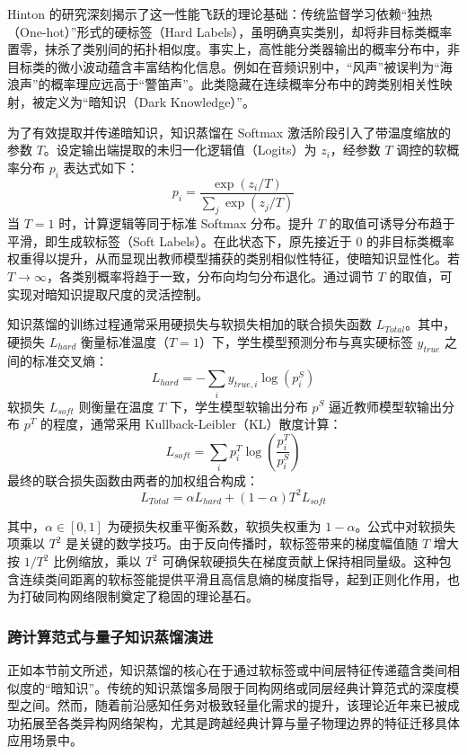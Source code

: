 Hinton 的研究深刻揭示了这一性能飞跃的理论基础：传统监督学习依赖“独热（One-hot）”形式的硬标签（Hard Labels），虽明确真实类别，却将非目标类概率置零，抹杀了类别间的拓扑相似度。事实上，高性能分类器输出的概率分布中，非目标类的微小波动蕴含丰富结构化信息。例如在音频识别中，“风声”被误判为“海浪声”的概率理应远高于“警笛声”。此类隐藏在连续概率分布中的跨类别相关性映射，被定义为“暗知识（Dark Knowledge）”。

为了有效提取并传递暗知识，知识蒸馏在 Softmax 激活阶段引入了带温度缩放的参数 $T$。设定输出端提取的未归一化逻辑值（Logits）为 $z_i$，经参数 $T$ 调控的软概率分布 $p_i$ 表达式如下：
\begin{equation}
	p_i = \frac{\exp(z_i / T)}{\sum_j \exp(z_j / T)}
\end{equation}
当 $T=1$ 时，计算逻辑等同于标准 Softmax 分布。提升 $T$ 的取值可诱导分布趋于平滑，即生成软标签（Soft Labels）。在此状态下，原先接近于 0 的非目标类概率权重得以提升，从而显现出教师模型捕获的类别相似性特征，使暗知识显性化。若 $T \to \infty$，各类别概率将趋于一致，分布向均匀分布退化。通过调节 $T$ 的取值，可实现对暗知识提取尺度的灵活控制。

知识蒸馏的训练过程通常采用硬损失与软损失相加的联合损失函数 $L_{Total}$。其中，硬损失 $L_{hard}$ 衡量标准温度（$T=1$）下，学生模型预测分布与真实硬标签 $y_{true}$ 之间的标准交叉熵：
\begin{equation}
	L_{hard} = - \sum_i y_{true, i} \log (p^S_i)
\end{equation}
软损失 $L_{soft}$ 则衡量在温度 $T$ 下，学生模型软输出分布 $p^S$ 逼近教师模型软输出分布 $p^T$ 的程度，通常采用 Kullback-Leibler（KL）散度计算：
\begin{equation}
	L_{soft} = \sum_i p^T_i \log\left(\frac{p^T_i}{p^S_i}\right)
\end{equation}
最终的联合损失函数由两者的加权组合构成：
\begin{equation}
	L_{Total} = \alpha L_{hard} + (1 - \alpha) T^2 L_{soft}
	\label{eq:kd_loss}
\end{equation}

其中，$\alpha \in [0, 1]$ 为硬损失权重平衡系数，软损失权重为 $1-\alpha$。公式中对软损失项乘以 $T^2$ 是关键的数学技巧。由于反向传播时，软标签带来的梯度幅值随 $T$ 增大按 $1/T^2$ 比例缩放，乘以 $T^2$ 可确保软硬损失在梯度贡献上保持相同量级。这种包含连续类间距离的软标签能提供平滑且高信息熵的梯度指导，起到正则化作用，也为打破同构网络限制奠定了稳固的理论基石。

\subsubsection{跨计算范式与量子知识蒸馏演进}
正如本节前文所述，知识蒸馏的核心在于通过软标签或中间层特征传递蕴含类间相似度的“暗知识”。传统的知识蒸馏多局限于同构网络或同层经典计算范式的深度模型之间。然而，随着前沿感知任务对极致轻量化需求的提升，该理论近年来已被成功拓展至各类异构网络架构，尤其是跨越经典计算与量子物理边界的特征迁移具体应用场景中。

